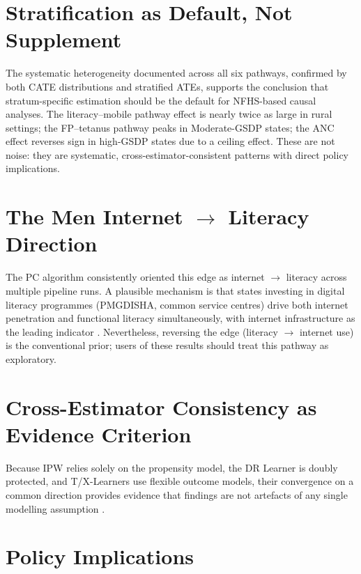 \documentclass[12pt,a4paper]{report}
\begin{document}
\section{Stratification as Default, Not Supplement}

The systematic heterogeneity documented across all six pathways, confirmed by both
CATE distributions and stratified ATEs, supports the conclusion that stratum-specific
estimation should be the default for NFHS-based causal analyses.
The literacy--mobile pathway effect is nearly twice as large in rural settings;
the FP--tetanus pathway peaks in Moderate-GSDP states; the ANC effect reverses
sign in high-GSDP states due to a ceiling effect.
These are not noise: they are systematic, cross-estimator-consistent patterns with
direct policy implications.

\section{The Men Internet $\to$ Literacy Direction}

The PC algorithm consistently oriented this edge as internet $\to$ literacy across
multiple pipeline runs. A plausible mechanism is that states investing in digital
literacy programmes (PMGDISHA, common service centres) drive both internet
penetration and functional literacy simultaneously, with internet infrastructure as
the leading indicator \citep{bbc2019literacy}.
Nevertheless, reversing the edge (literacy $\to$ internet use) is the conventional
prior; users of these results should treat this pathway as exploratory.

\section{Cross-Estimator Consistency as Evidence Criterion}

Because IPW relies solely on the propensity model, the DR Learner is doubly
protected, and T/X-Learners use flexible outcome models, their convergence on a
common direction provides evidence that findings are not artefacts of any single
modelling assumption \citep{chernozhukov2018doubleml,schuler2017targeted}.

\section{Policy Implications}
\end{document}
